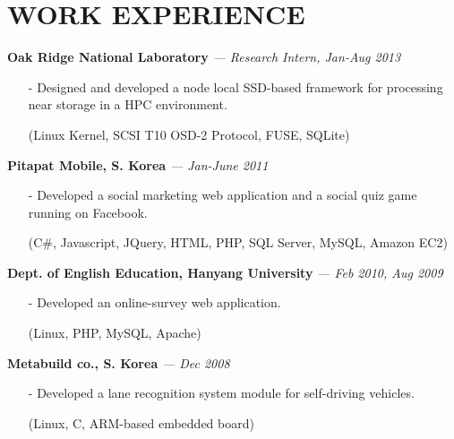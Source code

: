 \section{WORK EXPERIENCE} 
\vspace{0.03in} 
{\bf Oak Ridge National Laboratory}
{\it \footnotesize --- Research Intern, Jan-Aug 2013}
\begin{itemize}[leftmargin=*]
\setlength\itemsep{-0.02in}
 \item[-] Designed and developed a node local SSD-based framework for processing near
  storage in a HPC environment.
 \item[] {\small(Linux Kernel, SCSI T10 OSD-2 Protocol, FUSE, SQLite)}
\end{itemize}
\vspace{-0.15in}
{\bf Pitapat Mobile, S. Korea}
{\it \footnotesize --- Jan-June 2011}
\begin{itemize}[leftmargin=*]
\setlength\itemsep{-0.02in}
 \item[-] Developed a social marketing web application and a social quiz game running on
  Facebook.
 \item[] {\small(C\#, Javascript, JQuery, HTML, PHP, SQL Server, MySQL, Amazon EC2)}
\end{itemize}
\vspace{-0.15in}

{\bf Dept. of English Education, Hanyang University}
{\it \footnotesize --- Feb 2010, Aug 2009}
\begin{itemize}[leftmargin=*]
\setlength\itemsep{-0.02in}
 \item[-] Developed an online-survey web application.
 \item[] {\small(Linux, PHP, MySQL, Apache)}
\end{itemize}
\vspace{-0.15in}

{\bf Metabuild co., S. Korea}
{\it \footnotesize --- Dec 2008}
\begin{itemize}[leftmargin=*]
\setlength\itemsep{-0.02in}
 \item[-] Developed a lane recognition system module for self-driving vehicles.
 \item[] {\small(Linux, C, ARM-based embedded board)}
\end{itemize}

